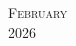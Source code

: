 \documentclass[10pt]{article} %
\begin{document}


\begin{center}
	\textsc{\LARGE February}\\ %
	\textsc{\large 2026} %
\end{center}


\begin{calendar}{\textwidth} %








\end{calendar}
\end{document}
